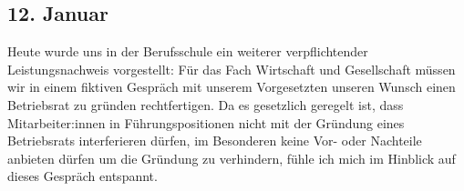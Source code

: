\subsection{12. Januar}
Heute wurde uns in der Berufsschule ein weiterer verpflichtender Leistungsnachweis vorgestellt: Für das Fach Wirtschaft und Gesellschaft müssen wir in einem fiktiven Gespräch mit unserem Vorgesetzten unseren Wunsch einen Betriebsrat zu gründen rechtfertigen. Da es gesetzlich geregelt ist, dass Mitarbeiter:innen in Führungspositionen nicht mit der Gründung eines Betriebsrats interferieren dürfen, im Besonderen keine Vor- oder Nachteile anbieten dürfen um die Gründung zu verhindern, fühle ich mich im Hinblick auf dieses Gespräch entspannt.